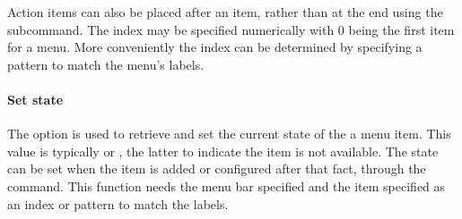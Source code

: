 Action items can also be placed after an item, rather than at the end
using the  subcommand. The
index may be specified numerically with 0 being the first item for a
menu.  More conveniently the index can be determined by specifying a
pattern to match the menu's labels.


\paragraph{Set state}
The  option is used to retrieve and set the current state
of the a menu item.  This value is typically  or
, the latter to indicate the item is not available. The
state can be set when the item is added or configured after that fact,
through the  command. This function
needs the menu bar specified and the item specified as an index or
pattern to match the labels.

